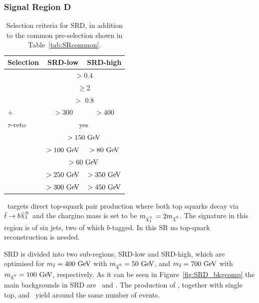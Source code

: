 			\subsubsection*{Signal Region D}

				\begin{table}[!htb]
				  \caption{Selection criteria for SRD, in addition to the common pre-selection shown in Table~\ref{tab:SRcommon}.}
				  \begin{center}
				  \def\arraystretch{1.4}
				  \begin{tabular}{lcc}
				    \toprule
				    {\textbf{Selection}}       & {\textbf{SRD-low}} & {\textbf{SRD-high}} \\
				    \toprule
				    \dphijetthreemet     & \multicolumn{2}{c}{$>0.4$}     \\ %
				    \nBJet      & \multicolumn{2}{c}{$\geq$2}    \\%
				    \drbjetbjet     & \multicolumn{2}{c}{$>$ 0.8}    \\ %
				    \ptbzero+\ptbone & $>300$ \gev    & $>400$ \gev     \\ %
				    $\tau$-veto          & \multicolumn{2}{c}{yes}        \\ %
				    \ptone\              & \multicolumn{2}{c}{$>150\GeV$} \\ %
				    \ptthree\            & $>100\GeV$    & $>80\GeV$      \\ %
				    \ptfour\             & \multicolumn{2}{c}{$>60\GeV$}  \\ %
				    \mtbmin\             & $>250\GeV$    & $>350\GeV$     \\ %
				    \mtbmax\             & $>300\GeV$    & $>450\GeV$     \\ 
				    \bottomrule
				  \end{tabular}
				  \end{center}
				  \label{tab:SignalRegionD}
				\end{table}
				
				\SRD\ targets direct top-squark pair production where both top squarks decay via $\stop\to b \chinoonepm$ and the chargino mass is set to be $m_{\chinoonepm}=2\mLSP$. The signature in this region is of six jets, two of which $b$-tagged. In this \ac{SR} no top-quark reconstruction is needed. 

				SRD is divided into two sub-regions, SRD-low and SRD-high, which are optimised for $\mstop = 400\GeV$ with $\mLSP=50\GeV$, and $\mstop = 700\GeV$ with $\mLSP=100\GeV$, respectively. As it can be seen in Figure~\ref{fig:SRD_bkgcomp} the main backgrounds in SRD are \Zjets\ and \Wjets. The production of \ttbar, together with single top, and \ttV\ yield around the same number of events.

